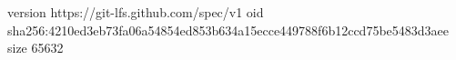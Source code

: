 version https://git-lfs.github.com/spec/v1
oid sha256:4210ed3eb73fa06a54854ed853b634a15ecce449788f6b12ccd75be5483d3aee
size 65632
